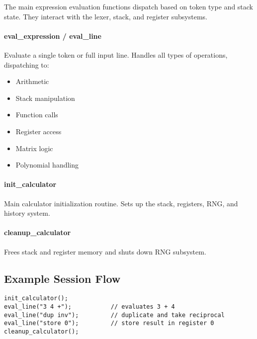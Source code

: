 \documentclass[12pt]{article}
\begin{document}
The main expression evaluation functions dispatch based on token type and stack state. They interact with the lexer, stack, and register subsystems.

\paragraph{eval\_expression / eval\_line}
Evaluate a single token or full input line.  
Handles all types of operations, dispatching to:

\begin{itemize}
  \item Arithmetic
  \item Stack manipulation
  \item Function calls
  \item Register access
  \item Matrix logic
  \item Polynomial handling
\end{itemize}

\paragraph{init\_calculator}
Main calculator initialization routine. Sets up the stack, registers, RNG, and history system.

\paragraph{cleanup\_calculator}
Frees stack and register memory and shuts down RNG subsystem.

\subsection{Example Session Flow}

\begin{verbatim}
init_calculator();
eval_line("3 4 +");           // evaluates 3 + 4
eval_line("dup inv");         // duplicate and take reciprocal
eval_line("store 0");         // store result in register 0
cleanup_calculator();
\end{verbatim}
\end{document}
